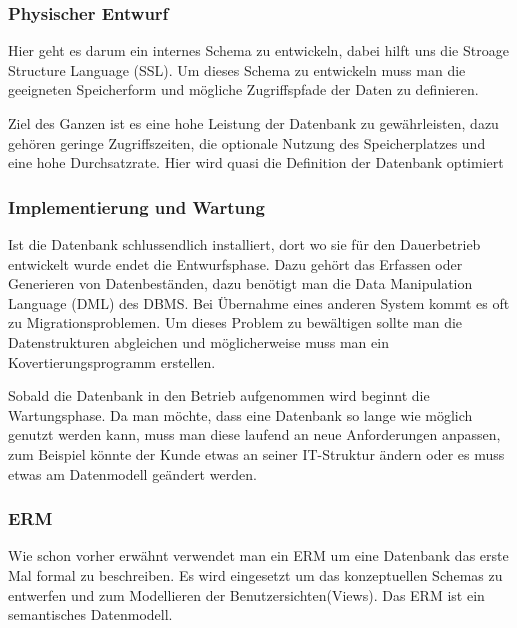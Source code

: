 \begin{flushleft}
\subsubsection{Physischer Entwurf}

Hier geht es darum ein internes Schema zu entwickeln, dabei hilft uns die Stroage Structure Language (SSL). Um dieses Schema zu entwickeln muss man die geeigneten Speicherform und mögliche Zugriffspfade der Daten zu definieren.

Ziel des Ganzen ist es eine hohe Leistung der Datenbank zu gewährleisten, dazu gehören geringe Zugriffszeiten, die optionale Nutzung des Speicherplatzes und eine hohe Durchsatzrate. Hier wird quasi die Definition der Datenbank optimiert

\subsubsection{Implementierung und Wartung}

Ist die Datenbank schlussendlich installiert, dort wo sie für den Dauerbetrieb entwickelt wurde endet die Entwurfsphase. Dazu gehört das Erfassen oder Generieren von Datenbeständen, dazu benötigt man die Data Manipulation Language (DML) des DBMS. Bei Übernahme eines anderen System kommt es oft zu Migrationsproblemen. Um dieses Problem zu bewältigen sollte man die Datenstrukturen abgleichen und möglicherweise muss man ein Kovertierungsprogramm erstellen.

Sobald die Datenbank in den Betrieb aufgenommen wird beginnt die Wartungsphase. Da man möchte, dass eine Datenbank so lange wie möglich genutzt werden kann, muss man diese laufend an neue Anforderungen anpassen, zum Beispiel könnte der Kunde etwas an seiner IT-Struktur ändern oder es muss etwas am Datenmodell geändert werden.




\subsubsection{ERM}
Wie schon vorher erwähnt verwendet man ein ERM um eine Datenbank das erste Mal formal zu beschreiben. Es wird eingesetzt um das konzeptuellen Schemas zu entwerfen und zum Modellieren der Benutzersichten(Views).
Das ERM ist ein semantisches Datenmodell.



\end{flushleft}
